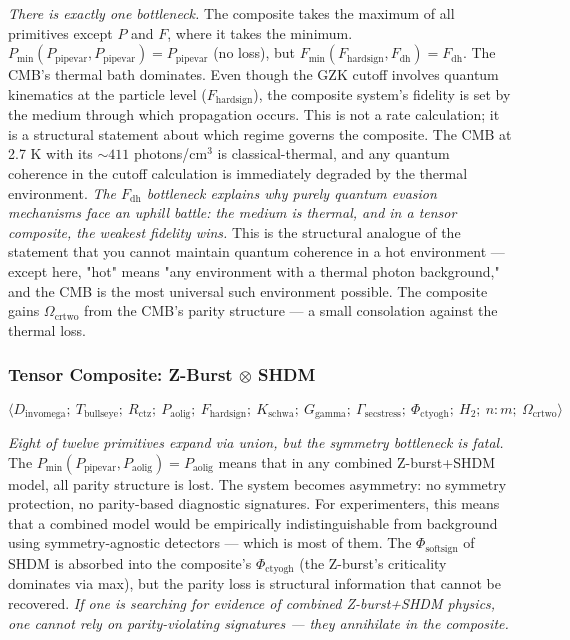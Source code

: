 \documentclass[12pt,a4paper]{article}
\begin{document}
\emph{There is exactly one bottleneck.} The composite takes the maximum of all primitives except $P$ and $F$, where it takes the minimum. $P_\text{min}(P_{\text{pipevar}}, P_{\text{pipevar}}) = P_{\text{pipevar}}$ (no loss), but $F_\text{min}(F_{\text{hardsign}}, F_{\text{dh}}) = F_{\text{dh}}$. The CMB's thermal bath dominates. Even though the GZK cutoff involves quantum kinematics at the particle level ($F_{\text{hardsign}}$), the composite system's fidelity is set by the medium through which propagation occurs. This is not a rate calculation; it is a structural statement about which regime governs the composite. The CMB at 2.7 K with its $\sim 411$ photons/cm$^3$ is classical-thermal, and any quantum coherence in the cutoff calculation is immediately degraded by the thermal environment. \emph{The $F_{\text{dh}}$ bottleneck explains why purely quantum evasion mechanisms face an uphill battle: the medium is thermal, and in a tensor composite, the weakest fidelity wins.} This is the structural analogue of the statement that you cannot maintain quantum coherence in a hot environment --- except here, "hot" means "any environment with a thermal photon background," and the CMB is the most universal such environment possible. The composite gains $\Omega_{\text{crtwo}}$ from the CMB's parity structure --- a small consolation against the thermal loss.

\subsubsection{Tensor Composite: Z-Burst $\otimes$ SHDM}

\[\langle D_{\text{invomega}};\ T_{\text{bullseye}};\ R_{\text{ctz}};\ P_{\text{aolig}};\ F_{\text{hardsign}};\ K_{\text{schwa}};\ G_{\text{gamma}};\ \Gamma_{\text{secstress}};\ \Phi_{\text{ctyogh}};\ H_2;\ n{:}m;\ \Omega_{\text{crtwo}} \rangle\]

\emph{Eight of twelve primitives expand via union, but the symmetry bottleneck is fatal.} The $P_\text{min}(P_{\text{pipevar}}, P_{\text{aolig}}) = P_{\text{aolig}}$ means that in any combined Z-burst+SHDM model, all parity structure is lost. The system becomes asymmetry: no symmetry protection, no parity-based diagnostic signatures. For experimenters, this means that a combined model would be empirically indistinguishable from background using symmetry-agnostic detectors --- which is most of them. The $\Phi_{\text{softsign}}$ of SHDM is absorbed into the composite's $\Phi_{\text{ctyogh}}$ (the Z-burst's criticality dominates via max), but the parity loss is structural information that cannot be recovered. \emph{If one is searching for evidence of combined Z-burst+SHDM physics, one cannot rely on parity-violating signatures --- they annihilate in the composite.}
\end{document}
